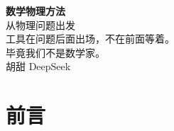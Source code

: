 



\frontmatter
\pagestyle{empty}

\begin{titlepage}
\vspace*{3.4cm}
\begin{center}
{\Huge\bfseries 数学物理方法}\\[0.6em]
{\LARGE 从物理问题出发}\\[1.6em]
{\large 工具在问题后面出场，不在前面等着。}\\[1.2em]
{\large 毕竟我们不是数学家。}\\[2.4cm]
{\large 胡甜 \quad DeepSeek}\\[1.4em]
\end{center}
\vfill
\end{titlepage}

\pagestyle{fancy}
\chapter*{前言}



\tableofcontents

\mainmatter
\pagestyle{fancy}
\setcounter{chapter}{-1}



\appendix


\backmatter



